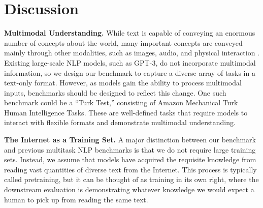 \section{Discussion}
\noindent\textbf{Multimodal Understanding.}\quad
While text is capable of conveying an enormous number of concepts about the world, many important concepts are conveyed mainly through other modalities, such as images, audio, and physical interaction \citep{bisk2020experiencegroundslang}. Existing large-scale NLP models, such as GPT-3, do not incorporate multimodal information, so we design our benchmark to capture a diverse array of tasks in a text-only format. However, as models gain the ability to process multimodal inputs, benchmarks should be designed to reflect this change. One such benchmark could be a ``Turk Test,'' consisting of Amazon Mechanical Turk Human Intelligence Tasks. These are well-defined tasks that require models to interact with flexible formats and demonstrate multimodal understanding.

\noindent\textbf{The Internet as a Training Set.}\quad
A major distinction between our benchmark and previous multitask NLP benchmarks is that we do not require large training sets. Instead, we assume that models have acquired the requisite knowledge from reading vast quantities of diverse text from the Internet. This process is typically called pretraining, but it can be thought of as training in its own right, where the downstream evaluation is demonstrating whatever knowledge we would expect a human to pick up from reading the same text. 


